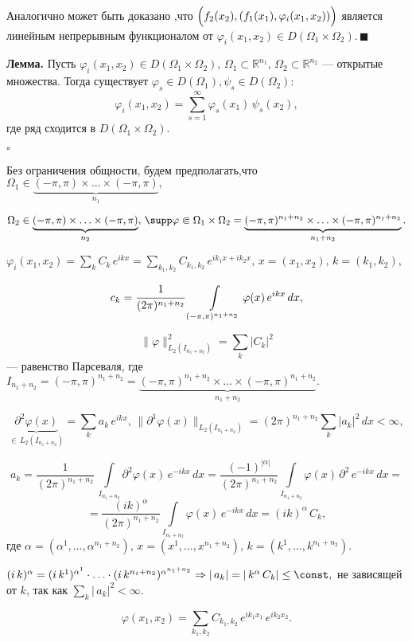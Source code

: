 \documentclass[12pt,a4paper,draft]{article}
\DeclareRobustCommand*{\т}{~--- }
\DeclareRobustCommand*{\ч}{~-- }
\begin{document}
Аналогично может быть доказано ,что
$\Bigl(f_2(x_2),(f_1(x_1),\varphi_i(x_1,x_2))\Bigr)$ является
линейным не\-прерывным функционалом от $\varphi_i(x_1,x_2)\in
D(\Omega_1\times\Omega_2).\,\blacksquare$

\textbf{Лемма.} Пусть $\varphi_i(x_1,x_2)\in
D(\Omega_1\times\Omega_2),\,\Omega_1\subset\mathbb
R^{n_1},\,\Omega_2\subset\mathbb R^{n_2}$ --- открытые множества.
Тогда существует $\varphi_s\in D(\Omega_1), \psi_s\in
D(\Omega_2)\colon$
$$\varphi_i(x_1,x_2)=\sum_{s=1}^{\infty}\varphi_s(x_1)\,\psi_s(x_2),$$
где ряд сходится в $D(\Omega_1\times\Omega_2).$

$\square$

Без ограничения общности, будем предполагать,что $\Omega_1\in
\underbrace{(-\pi,\pi)\times\ldots\times(-\pi,\pi)}_{n_1},\,$

$\Omega_2\in\underbrace{(-\pi,\pi)\times\ldots\times(-\pi,\pi)}_{n_2},\,
\supp \varphi\Subset\Omega_1\times\Omega_2=
\underbrace{(-\pi,\pi)^{n_1+n_2}\times\ldots\times(-\pi,\pi)^{n_1+n_2}}_{n_1+n_2}.$

$\varphi_i(x_1,x_2)=\sum\limits_k C_k\,e^{ikx}=
\sum\limits_{k_1,k_2}C_{k_1,k_2}\,e^{ik_1x+ik_2x},\,x=(x_1,x_2),\,k=(k_1,k_2),$

$$c_k=\cfrac1{(2\pi)^{n_1+n_2}}\,\int\limits_{(-\pi,\pi)^{n_1+n_2}}\varphi(x)\,e^{ikx}\,dx,$$

$$\|\varphi\|_{L_2(I_{n_1+n_2})}^2=\sum_k |C_k|^2$$ --- равенство
Парсеваля, где $I_{n_1+n_2}=(-\pi,\pi)^{n_1+n_2}=
\underbrace{(-\pi,\pi)^{n_1+n_2}\times\ldots\times(-\pi,\pi)^{n_1+n_2}}_{n_1+n_2}.$

$$\underbrace{\partial^2\varphi(x)}_{\in \,L_2(I_{n_1+n_2})}=
\sum\limits_k a_k \,e^{ikx},\,
\|\partial^1\varphi(x)\|_{L_2(I_{n_1+n_2})}=(2\pi)^{n_1+n_2}
\sum\limits_k |a_k|^2 \,dx<\infty,$$

$$a_k=\frac1{(2\pi)^{n_1+n_2}}\,\int\limits_{I_{n_1+n_2}}\partial^2\varphi(x)\,e^{-ikx}\,dx=
\frac{(-1)^{|\alpha|}}{(2\pi)^{n_1+n_2}}\int\limits_{I_{n_1+n_2}}\varphi(x)\,\partial^2\,e^{-ikx}\,dx=$$
$$=\frac{(ik)^{\alpha}}{(2\pi)^{n_1+n_2}}\int\limits_{I_{n_1+n_2}}\varphi(x)\,e^{-ikx}\,dx=
(ik)^{\alpha}\,C_k,$$ где
$\alpha=(\alpha^1,\ldots,\alpha^{n_1+n_2}),\,x=(x^1,\ldots,x^{n_1+n_2}),\,k=(k^1,\ldots,k^{n_1+n_2}).$

$(i\,k)^{\alpha}=(i\,k^1)^{\alpha^1}\cdot\ldots\cdot(i\,k^{n_1+n_2})^{\alpha^{n_1+n_2}}
\Rightarrow |\,a_k|=|\,k^{\alpha}\,C_k|\le \const  ,$ не зависящей
от $k$, так как $\sum_k |\,a_k|^2<{\infty}.$

$$\varphi(x_1,x_2)=\sum\limits_{k_1,k_2}C_{k_1,k_2}\,e^{ik_1x_1}\,e^{ik_2x_2}.$$
\end{document}
